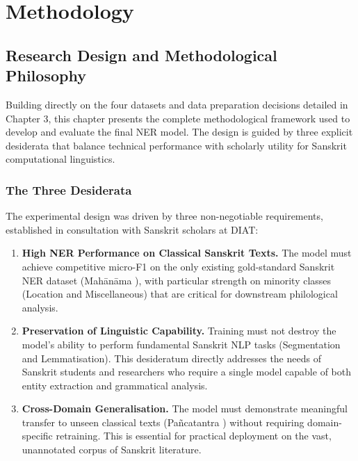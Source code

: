 
\chapter{Methodology}
\label{chap:methodology}

\section{Research Design and Methodological Philosophy}
\label{sec:research_design}

Building directly on the four datasets and data preparation decisions detailed in Chapter 3, this chapter presents the complete methodological framework used to develop and evaluate the final NER model. The design is guided by three explicit desiderata that balance technical performance with scholarly utility for Sanskrit computational linguistics.

\subsection{The Three Desiderata}
\label{subsec:three_desiderata}

The experimental design was driven by three non-negotiable requirements, established in consultation with Sanskrit scholars at DIAT:

\begin{enumerate}
    \item \textbf{High NER Performance on Classical Sanskrit Texts.} The model must achieve competitive micro-F1 on the only existing gold-standard Sanskrit NER dataset (Mahānāma \cite{sarkar2025mahanama}), with particular strength on minority classes (Location and Miscellaneous) that are critical for downstream philological analysis.
    
    \item \textbf{Preservation of Linguistic Capability.} Training must not destroy the model's ability to perform fundamental Sanskrit NLP tasks (Segmentation and Lemmatisation). This desideratum directly addresses the needs of Sanskrit students and researchers who require a single model capable of both entity extraction and grammatical analysis.
    
    \item \textbf{Cross-Domain Generalisation.} The model must demonstrate meaningful transfer to unseen classical texts (Pañcatantra \cite{pancatantra_text}) without requiring domain-specific retraining. This is essential for practical deployment on the vast, unannotated corpus of Sanskrit literature.
\end{enumerate}

